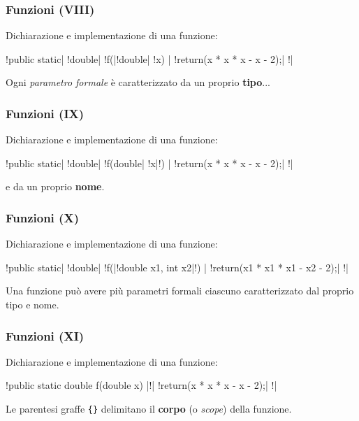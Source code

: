 \begin{frame}[fragile]\frametitle{Funzioni (VIII)}

  Dichiarazione e implementazione di una funzione:

  \begin{JavaCodePlain}[commandchars=\\!|]
  \Grey!public static| \Grey!double| \Grey!f(|\Red!double| \Grey!x) {|
      \Grey!return(x * x * x - x - 2);|
  \Grey!}|
  \end{JavaCodePlain}

  Ogni \emph{parametro formale} è caratterizzato da un proprio  \textbf{tipo}...

\end{frame}

\begin{frame}[fragile]\frametitle{Funzioni (IX)}

  Dichiarazione e implementazione di una funzione:

  \begin{JavaCodePlain}[commandchars=\\!|]
  \Grey!public static| \Grey!double| \Grey!f(double| \Red!x|\Grey!) {|
      \Grey!return(x * x * x - x - 2);|
  \Grey!}|
  \end{JavaCodePlain}

  e da un proprio \textbf{nome}.

\end{frame}

\begin{frame}[fragile]\frametitle{Funzioni (X)}

  Dichiarazione e implementazione di una funzione:

  \begin{JavaCodePlain}[commandchars=\\!|]
  \Grey!public static| \Grey!double| \Grey!f(|\Red!double x1, int x2|\Grey!) {|
      \Grey!return(x1 * x1 * x1 - x2 - 2);|
  \Grey!}|
  \end{JavaCodePlain}

  Una funzione può avere più parametri formali ciascuno caratterizzato dal
  proprio tipo e nome.

\end{frame}

\begin{frame}[fragile]\frametitle{Funzioni (XI)}

  Dichiarazione e implementazione di una funzione:
  
  \begin{JavaCodePlain}[commandchars=\\!|]
  \Grey!public static double f(double x) |\Red!{|
      \Red!return(x * x * x - x - 2);|
  \Red!}|
  \end{JavaCodePlain}

  Le parentesi graffe \texttt{\{\}} delimitano il \textbf{corpo}
  (o \emph{scope}) della funzione.

\end{frame}

